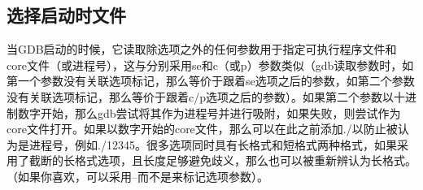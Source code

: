 \documentclass[a4paper,12pt,english]{sphinxmanual}
\begin{document}
\subsection{选择启动时文件}
\label{\detokenize{debug/debug:id2}}
\sphinxAtStartPar
当GDB启动的时候，它读取除选项之外的任何参数用于指定可执行程序文件和core文件（或进程号），这与分别采用\sphinxhyphen{}se和\sphinxhyphen{}c（或\sphinxhyphen{}p）参数类似（gdb读取参数时，如第一个参数没有关联选项标记，那么等价于跟着\sphinxhyphen{}se选项之后的参数，如第二个参数没有关联选项标记，那么等价于跟着\sphinxhyphen{}c/\sphinxhyphen{}p选项之后的参数）。如果第二个参数以十进制数字开始，那么gdb尝试将其作为进程号并进行吸附，如果失败，则尝试作为core文件打开。如果以数字开始的core文件，那么可以在此之前添加./以防止被认为是进程号，例如./12345。很多选项同时具有长格式和短格式两种格式，如果采用了截断的长格式选项，且长度足够避免歧义，那么也可以被重新辨认为长格式。（如果你喜欢，可以采用–而不是\sphinxhyphen{}来标记选项参数）。
\end{document}
